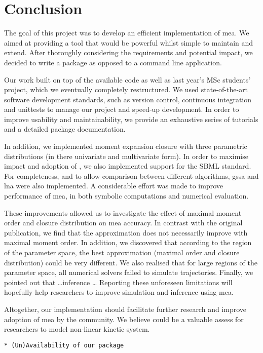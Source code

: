 \section{Conclusion} \label{sec:conclus}

The goal of this project was to develop an efficient \py{} implementation of \acrlong{mea}.
We aimed at providing a tool that would be powerful whilst simple to maintain and extend.
After thoroughly considering the requirements and potential impact, we decided to write a \py{} package as opposed to a command line application.

Our work built on top of the available \mat{} code as well as last year's MSc students' project, which we eventually completely restructured.
We used state-of-the-art software development standards, such as version control, continuous integration and unittests to manage our project and speed-up development.
In order to improve usability and maintainability, we provide an exhaustive series of tutorials and a detailed package documentation.

In addition, we implemented moment expansion closure with three parametric distributions (in there univariate and multivariate form).
In order to maximise impact and adoption of \means, we also implemented support for the SBML standard.
For completeness, and to allow comparison between different algorithms, \gls{gssa} and \gls{lna} were also implemented.
A considerable effort was made to improve performance of \gls{mea},  in both symbolic computations and numerical evaluation.

These improvements allowed us to investigate the effect of maximal moment order and closure distribution on \gls{mea} accuracy.
In contrast with the original publication, we find that the approximation does not necessarily improve with maximal moment order.
In addition, we discovered that according to the region of the parameter space, the best approximation (maximal order and closure distribution) could be very different.
We also realised that for large regions of the parameter space, all numerical solvers failed to simulate trajectories.
Finally, we pointed out that \ldots inference \ldots {}
Reporting these unforeseen limitations will hopefully help researchers to improve simulation and inference using \gls{mea}.

Altogether, our implementation should facilitate further research and improve adoption of \acrlong{mea} by the community.
We believe \means{} could be a valuable assess for researchers to model non-linear kinetic system.
 


\begin{verbatim}
* (Un)Availability of our package
\end{verbatim}

